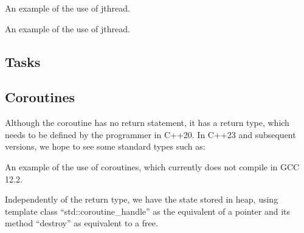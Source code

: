 \raggedbottom
\begin{codebox}[]{\href{https://godbolt.org/z/}{\ExternalLink}}
\footnotesize An example of the use of jthread.
\tcblower
{}
\end{codebox}

\raggedbottom
\begin{codebox}[]{\href{https://godbolt.org/z/}{\ExternalLink}}
\footnotesize An example of the use of jthread.
\tcblower
{}
\end{codebox}

\subsection{Tasks}

\subsection{Coroutines}

Although the coroutine has no return statement, it has a return type, which needs to be defined by the programmer in C++20. In C++23 and subsequent versions, we hope to see some standard types such as:

\raggedbottom
\begin{codebox}[]{}
\footnotesize An example of the use of coroutines, which currently does not compile in GCC 12.2.
\tcblower
{}
\end{codebox}

Independently of the return type, we have the state stored in heap, using template class ``std::coroutine_handle'' as the equivalent of a pointer and its method ``destroy'' as equivalent to a free. 

